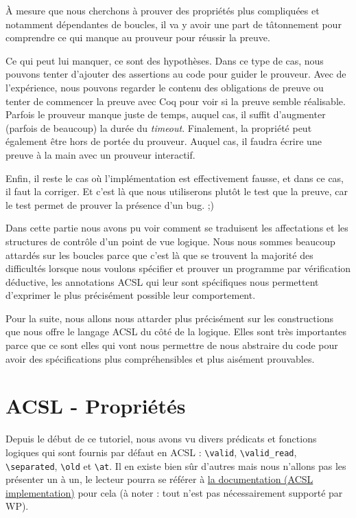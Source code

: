 \documentclass[12pt,francais,]{scrbook}
\begin{document}
À mesure que nous cherchons à prouver des propriétés plus compliquées et
notamment dépendantes de boucles, il va y avoir une part de tâtonnement
pour comprendre ce qui manque au prouveur pour réussir la preuve.

Ce qui peut lui manquer, ce sont des hypothèses. Dans ce type de cas,
nous pouvons tenter d'ajouter des assertions au code pour guider le
prouveur. Avec de l'expérience, nous pouvons regarder le contenu des
obligations de preuve ou tenter de commencer la preuve avec Coq pour
voir si la preuve semble réalisable. Parfois le prouveur manque juste de
temps, auquel cas, il suffit d'augmenter (parfois de beaucoup) la durée
du \emph{timeout}. Finalement, la propriété peut également être hors de
portée du prouveur. Auquel cas, il faudra écrire une preuve à la main
avec un prouveur interactif.

Enfin, il reste le cas où l'implémentation est effectivement fausse, et
dans ce cas, il faut la corriger. Et c'est là que nous utiliserons
plutôt le test que la preuve, car le test permet de prouver la présence
d'un bug. ;)

Dans cette partie nous avons pu voir comment se traduisent les
affectations et les structures de contrôle d'un point de vue logique.
Nous nous sommes beaucoup attardés sur les boucles parce que c'est là
que se trouvent la majorité des difficultés lorsque nous voulons
spécifier et prouver un programme par vérification déductive, les
annotations ACSL qui leur sont spécifiques nous permettent d'exprimer le
plus précisément possible leur comportement.

Pour la suite, nous allons nous attarder plus précisément sur les
constructions que nous offre le langage ACSL du côté de la logique.
Elles sont très importantes parce que ce sont elles qui vont nous
permettre de nous abstraire du code pour avoir des spécifications plus
compréhensibles et plus aisément prouvables.

\chapter{ACSL - Propriétés}\label{acsl---propriuxe9tuxe9s}

Depuis le début de ce tutoriel, nous avons vu divers prédicats et
fonctions logiques qui sont fournis par défaut en ACSL :
\texttt{\textbackslash{}valid}, \texttt{\textbackslash{}valid\_read},
\texttt{\textbackslash{}separated}, \texttt{\textbackslash{}old} et
\texttt{\textbackslash{}at}. Il en existe bien sûr d'autres mais nous
n'allons pas les présenter un à un, le lecteur pourra se référer à
\href{http://frama-c.com/download.html}{la documentation (ACSL
implementation)} pour cela (à noter : tout n'est pas nécessairement
supporté par WP).
\end{document}
